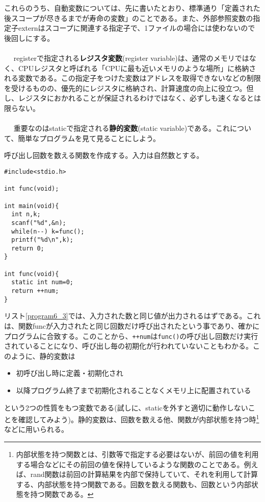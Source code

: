 これらのうち、自動変数については、先に書いたとおり、標準通り「定義された後スコープが尽きるまでが寿命の変数」のことである。また、外部参照変数の指定子externはスコープに関連する指定子で、1ファイルの場合には使わないので後回しにする。
\\ \\　
registerで指定される\textbf{レジスタ変数}(register variable)は、通常のメモリではなく、CPUレジスタと呼ばれる「CPUに最も近いメモリのような場所」に格納される変数である。この指定子をつけた変数はアドレスを取得できないなどの制限を受けるものの、優先的にレジスタに格納され、計算速度の向上に役立つ。但し、レジスタにおかれることが保証されるわけではなく、必ずしも速くなるとは限らない。
\\ \\　
重要なのはstaticで指定される\textbf{静的変数}(static variable)である。これについて、簡単なプログラムを見て見ることにしよう。
\begin{boxnote}
呼び出し回数を数える関数を作成する。入力は自然数とする。
\begin{multicols}{2}
\begin{lstlisting}[caption=呼び出し回数,label=program6_3]
#include<stdio.h>

int func(void);

int main(void){
  int n,k;
  scanf("%d",&n);
  while(n--) k=func();
  printf("%d\n",k);
  return 0;
}

int func(void){
  static int num=0;
  return ++num;
}
\end{lstlisting}
\end{multicols}
\end{boxnote}

リスト\ref{program6_3}では、入力された数と同じ値が出力されるはずである。これは、関数funcが入力されたと同じ回数だけ呼び出されたという事であり、確かにプログラムに合致する。このことから、\verb|++num|は\verb|func()|の呼び出し回数だけ実行されていることになり、呼び出し毎の初期化が行われていないこともわかる。このように、静的変数は
\begin{itemize}
\item 初呼び出し時に定義・初期化され
\item 以降プログラム終了まで初期化されることなくメモリ上に配置されている
\end{itemize}
という2つの性質をもつ変数である(試しに、staticを外すと適切に動作しないことを確認してみよう)。静的変数は、回数を数える他、関数が内部状態を持つ時\footnote{内部状態を持つ関数とは、引数等で指定する必要はないが、前回の値を利用する場合などにその前回の値を保持しているような関数のことである。例えば、rand関数は前回の計算結果を内部で保持していて、それを利用して計算する、内部状態を持つ関数である。回数を数える関数も、回数という内部状態を持つ関数である。}などに用いられる。

